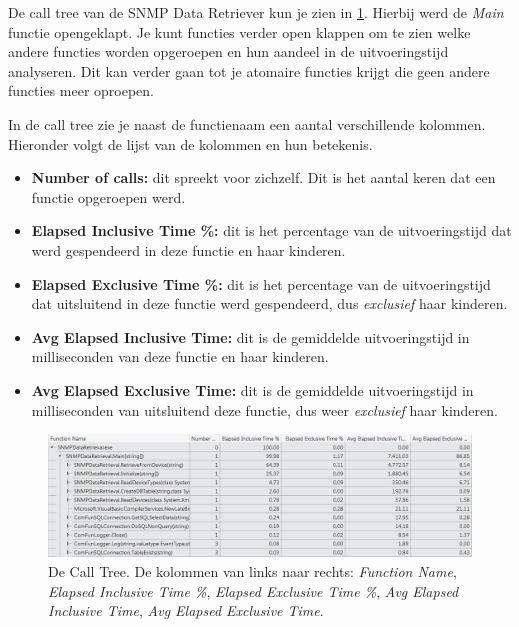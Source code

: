 De call tree van de SNMP Data Retriever kun je zien in \cref{call-tree}.
Hierbij werd de \emph{Main} functie opengeklapt. %
Je kunt functies verder open klappen om te zien welke andere functies worden opgeroepen en hun aandeel in de uitvoeringstijd analyseren.
Dit kan verder gaan tot je atomaire functies krijgt die geen andere functies meer oproepen.

In de call tree zie je naast de functienaam een aantal verschillende kolommen. Hieronder volgt de lijst van de kolommen en hun betekenis.

\begin{itemize}
	\item \textbf{Number of calls:}
		dit spreekt voor zichzelf. Dit is het aantal keren dat een functie opgeroepen werd.
	\item \textbf{Elapsed Inclusive Time \%:}
		dit is het percentage van de uitvoeringstijd dat werd gespendeerd in deze functie en haar kinderen.
	\item \textbf{Elapsed Exclusive Time \%:}
		dit is het percentage van de uitvoeringstijd dat uitsluitend in deze functie werd gespendeerd, dus \emph{exclusief} haar kinderen.
	\item \textbf{Avg Elapsed Inclusive Time:}
		dit is de gemiddelde uitvoeringstijd in milliseconden van deze functie en haar kinderen.
	\item \textbf{Avg Elapsed Exclusive Time:}
		dit is de gemiddelde uitvoeringstijd in milliseconden van uitsluitend deze functie, dus weer \emph{exclusief} haar kinderen.
\end{itemize}

\begin{figure}[h]
	\centering
	\includegraphics[scale=0.50]{figures/profiler/call-tree}
	\caption[De Call Tree]{De Call Tree. De kolommen van links naar rechts:
		\emph{Function Name},
		\emph{Elapsed Inclusive Time \%},
		\emph{Elapsed Exclusive Time \%},
		\emph{Avg Elapsed Inclusive Time},
		\emph{Avg Elapsed Exclusive Time}.}
	\label{call-tree}
\end{figure}

